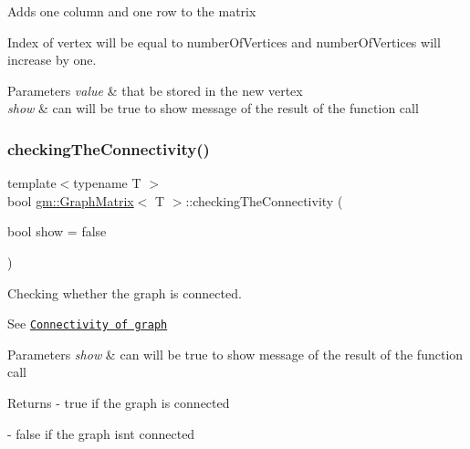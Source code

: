 Adds one column and one row to the \textquotesingle{}matrix\textquotesingle{}

Index of vertex will be equal to \textquotesingle{}number\+Of\+Vertices\textquotesingle{} and \textquotesingle{}number\+Of\+Vertices\textquotesingle{} will increase by one.


\begin{DoxyParams}{Parameters}
{\em value} & that be stored in the new vertex \\
\hline
{\em show} & can will be true to show message of the result of the function call \\
\hline
\end{DoxyParams}
\mbox{\label{classgm_1_1_graph_matrix_ab91a8713c4e8ed19bedc58f1cfab2bc5}} 
\subsubsection{\texorpdfstring{checking\+The\+Connectivity()}{checkingTheConnectivity()}}
{\footnotesize\ttfamily template$<$typename T $>$ \\
bool \mbox{\hyperlink{classgm_1_1_graph_matrix}{gm\+::\+Graph\+Matrix}}$<$ T $>$\+::checking\+The\+Connectivity (\begin{DoxyParamCaption}\item[{bool}]{show = {\ttfamily false} }\end{DoxyParamCaption})}



Checking whether the graph is connected. 

See \href{https://en.wikipedia.org/w/index.php?search=Connectivity+graph+theory&title=Special%3ASearch&fulltext=1&ns0=1}{\tt Connectivity of graph} 
\begin{DoxyParams}{Parameters}
{\em show} & can will be true to show message of the result of the function call \\
\hline
\end{DoxyParams}
\begin{DoxyReturn}{Returns}
-\/ true if the graph is connected 

-\/ false if the graph isn\textquotesingle{}t connected 
\end{DoxyReturn}
\mbox{\label{classgm_1_1_graph_matrix_a91506a78cf2efe32f6c48a7f12914a43}} 
